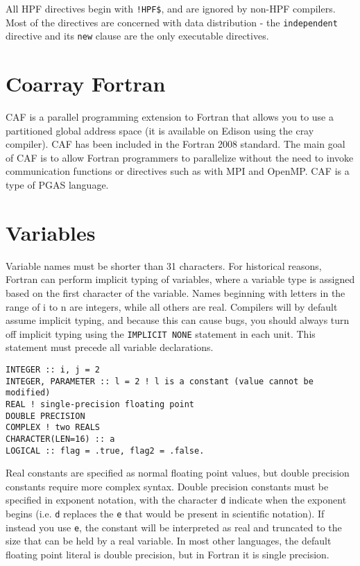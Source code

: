 \documentclass[10pt]{article}
\begin{document}
All HPF directives begin with {\tt !HPF\$}, and are ignored by non-HPF compilers. Most of the directives are concerned with data distribution - the {\tt independent} directive and its {\tt new} clause are the only executable directives. 

\section{Coarray Fortran}
CAF is a parallel programming extension to Fortran that allows you to use a partitioned global address space (it is available on Edison using the cray compiler). CAF has been included in the Fortran 2008 standard. The main goal of CAF is to allow Fortran programmers to parallelize without the need to invoke communication functions or directives such as with MPI and OpenMP. CAF is a type of PGAS language. 

\section{Variables}
Variable names must be shorter than 31 characters. For historical reasons, Fortran can perform implicit typing of variables, where a variable type is assigned based on the first character of the variable. Names beginning with letters in the range of i to n are integers, while all others are real. Compilers will by default assume implicit typing, and because this can cause bugs, you should always turn off implicit typing using the {\tt IMPLICIT NONE} statement in each unit. This statement must precede all variable declarations. 

\begin{lstlisting}
INTEGER :: i, j = 2
INTEGER, PARAMETER :: l = 2 ! l is a constant (value cannot be modified)
REAL ! single-precision floating point
DOUBLE PRECISION
COMPLEX ! two REALS
CHARACTER(LEN=16) :: a
LOGICAL :: flag = .true, flag2 = .false.
\end{lstlisting}

Real constants are specified as normal floating point values, but double precision constants require more complex syntax. Double precision constants must be specified in exponent notation, with the character {\tt d} indicate when the exponent begins (i.e. {\tt d} replaces the {\tt e} that would be present in scientific notation). If instead you use {\tt e}, the constant will be interpreted as real and truncated to the size that can be held by a real variable. In most other languages, the default floating point literal is double precision, but in Fortran it is single precision.
\end{document}

